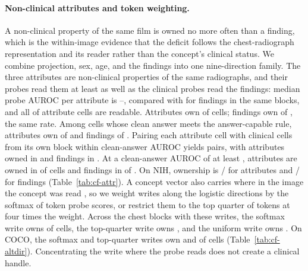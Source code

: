 \paragraph{Non-clinical attributes and token weighting.} A non-clinical property of the same film is owned no more often than a finding, which is the within-image evidence that the deficit follows the chest-radiograph representation and its reader rather than the concept's clinical status. We combine projection, sex, age, and the findings into one nine-direction family. The three attributes are non-clinical properties of the same radiographs, and their probes read them at least as well as the clinical probes read the findings: median probe AUROC per attribute is \cfAttrAurocMin{}--\cfAttrAurocMax{}, compared with \cfAttrClinAuroc{} for findings in the same blocks, and all \cfAttrReadable{} of \cfAttrChestAttrN{} attribute cells are readable. Attributes own \cfAttrAllAttrOwned{} of \cfAttrAllAttrN{} cells; findings own \cfAttrAllClinOwned{} of \cfAttrAllClinN{}, the same rate. Among cells whose clean answer meets the answer-capable rule, attributes own \cfAttrCapAttrOwned{} of \cfAttrCapAttrN{} and findings \cfAttrCapClinOwned{} of \cfAttrCapClinN{}. Pairing each attribute cell with clinical cells from its own block within \cfAttrPairWindow{} clean-answer AUROC yields \cfAttrPairAttrN{} pairs, with attributes owned in \cfAttrPairAttrOwned{} and findings in \cfAttrPairClinOwned{}. At a clean-answer AUROC of at least \cfStratTopEdge{}, attributes are owned in \cfStratAttrTopOwned{} of \cfStratAttrTopN{} cells and findings in \cfStratFindTopOwned{} of \cfStratFindTopN{}. On NIH, ownership is \cfAttrNihAttrOwned{}/\cfAttrNihAttrN{} for attributes and \cfAttrNihClinOwned{}/\cfAttrNihClinN{} for findings (Table~\ref{tab:cf-attr}). A concept vector also carries where in the image the concept was read \citep{nicolson2025explaining}, so we weight writes along the logistic directions by the softmax of token probe scores, or restrict them to the top quarter of tokens at four times the weight. Across the \cfTokenwChestBlocks{} chest blocks with these writes, the softmax write owns \cfTokenwSoftChestOwned{} of \cfTokenwChestCells{} cells, the top-quarter write owns \cfTokenwTopqChestOwned{}, and the uniform write owns \cfTokenwUniformChestOwned{}. On COCO, the softmax and top-quarter writes own \cfTokenwSoftCocoOwned{} and \cfTokenwTopqCocoOwned{} of \cfTokenwCocoCells{} cells (Table~\ref{tab:cf-altdir}). Concentrating the write where the probe reads does not create a clinical handle.


\FloatBarrier
